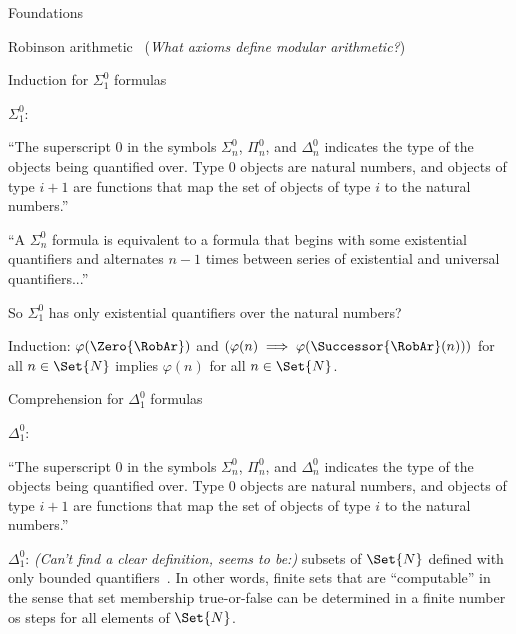 \documentclass[12pt]{PalisadesLakesBook}
\begin{document}
\begin{plSection}{Foundations}
\begin{plSection}{\texorpdfstring{}{RCA0}}
\begin{plSection}{Robinson arithmetic~\cite{wiki:RobinsonArithmetic}}
    (\TODO \textit{What axioms define modular arithmetic?})

  \end{plSection}%

  \begin{plSection}{Induction for \texorpdfstring{$\Sigma^{0}_{1}$}{Sigma01} formulas}

  $\Sigma^{0}_{1}$:

  ``The superscript
  $0$ in the symbols $\Sigma _{n}^{0}$,
  $\Pi^0_n$, and
  $\Delta_{n}^{0}$ indicates the type of the objects being quantified over.
  Type $0$ objects are natural numbers, and objects of type
  $i+1$ are functions that map the set of objects of type
  $i$ to the natural numbers.''~\cite{wiki:ArithmeticalHierarchy}

  ``A $\Sigma _{n}^{0}$ formula is equivalent to a formula that begins with some existential quantifiers and alternates
  $n-1$ times between series of existential and universal quantifiers...''~\cite{wiki:ArithmeticalHierarchy}

  So $\Sigma _{1}^{0}$ has only existential quantifiers over the natural numbers?

  Induction:
  $\varphi(\Zero{\RobAr})$ and $\left( \varphi(n) \implies \varphi(\Successor{\RobAr}(n)) \right)$ for all $n \in \Set{N}$
  implies $\varphi(n)$ for all $n \in \Set{N}$.~\cite{wiki:Induction}

  \end{plSection}%

  \begin{plSection}{Comprehension for \texorpdfstring{$\Delta^{0}_{1}$}{Delta01} formulas}

    $\Delta^{0}_{1}$:

    ``The superscript
    $0$ in the symbols $\Sigma_{n}^{0}$,
    $\Pi^0_n$, and
    $\Delta_{n}^{0}$ indicates the type of the objects being quantified over.
    Type $0$ objects are natural numbers, and objects of type
    $i+1$ are functions that map the set of objects of type
    $i$ to the natural numbers.''~\cite{wiki:ArithmeticalHierarchy}

    $\Delta^{0}_{1}$: \textit{(Can't find a clear definition, seems to be:)}
    subsets of $\Set{N}$ defined with only bounded quantifiers~\cite{wiki:BoundedQuantifier}.
    In other words, finite sets that are ``computable'' in the sense that set membership
    true-or-false can be determined in a finite number os steps for all elements of $\Set{N}$.


\end{plSection}
\end{plSection}
\end{plSection}
\end{document}
